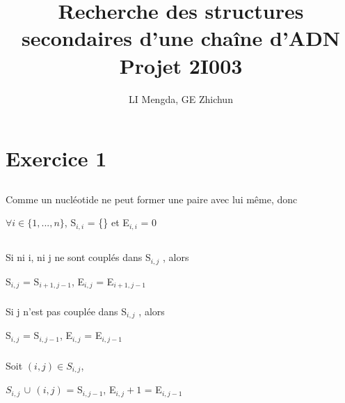 \documentclass[french]{article}
\title{Recherche des structures secondaires d’une chaîne d’ADN\\
\large Projet 2I003}
\author{LI Mengda, GE Zhichun}
\begin{document}
\lstset{language=Python}	

\maketitle

\section{Exercice 1}

\subsection{}
Comme un nucléotide ne peut former une paire avec lui même, donc 

\begin{center}
$\forall i\in\{1,...,n\}$, S$_{i,i}$ = \{\} et E$_{i,i}$ = 0
\par\end{center}

\subsection{}

	\subsubsection{}
	Si ni i, ni j ne sont couplés dans S$_{i,j}$ , alors
	\begin{center}
	S$_{i,j}$ = S$_{i+1,j-1}$, E$_{i,j}$ = E$_{i+1,j-1}$
	\par\end{center}

	\subsubsection{}
	Si j n'est pas couplée dans S$_{i,j}$ , alors
	\begin{center}
	S$_{i,j}$ = S$_{i,j-1}$, E$_{i,j}$ = E$_{i,j-1}$
	\par\end{center}

	\subsubsection{}
	Soit $\left(i,j\right)\in S_{i,j}$,
	\begin{center}
	$S_{i,j} \, \cup \, \left(i,j\right)$  = S$_{i,j-1}$,  E$_{i,j}+ 1$  = E$_{i,j-1}$
	\par\end{center}
\end{document}
